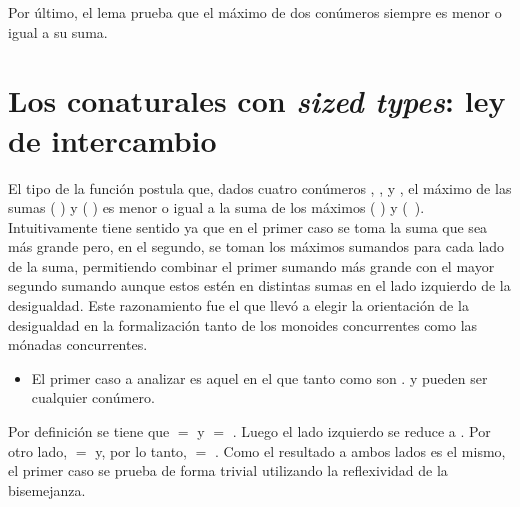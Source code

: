 Por último, el lema  prueba que el máximo de dos conúmeros siempre es menor o igual a su suma.

\section{Los conaturales con \textit{sized types}: ley de intercambio}\label{apendice:interchange}

\begin{AgdaAlign}
El tipo de la función  postula que, dados cuatro conúmeros , ,  y , el máximo de las sumas ( \AgdaFunction{+} ) y ( \AgdaFunction{+} ) es menor o igual a la suma de los máximos (  ) y \hbox{(  )}. Intuitivamente tiene sentido ya que en el primer caso se toma la suma que sea más grande pero, en el segundo, se toman los máximos sumandos para cada lado de la suma, permitiendo combinar el primer sumando más grande con el mayor segundo sumando aunque estos estén en distintas sumas en el lado izquierdo de la desigualdad. Este razonamiento fue el que llevó a elegir la orientación de la desigualdad en la formalización tanto de los monoides concurrentes como las mónadas concurrentes. 

\begin{itemize}
\item El primer caso a analizar es aquel en el que tanto  como 
 son .  y  pueden ser cualquier conúmero.
\end{itemize}

Por definición se tiene que  \AgdaFunction{+}  $=$  y  \AgdaFunction{+}  $=$ . Luego el lado izquierdo se reduce a   . Por otro lado,    $=$  y, por lo tanto,    \AgdaFunction{+}   $=$  . Como el resultado a ambos lados es el mismo, el primer caso se prueba de forma trivial utilizando la reflexividad de la bisemejanza.


\end{AgdaAlign}
